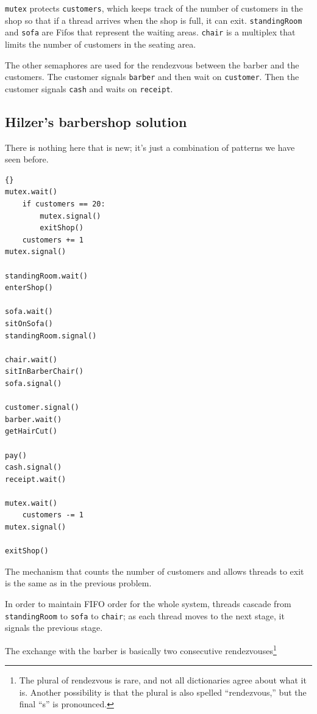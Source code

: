 \documentclass{book}
\newcommand{\clearemptydoublepage}{\newpage\cleardoublepage}
\begin{document}
{\tt mutex} protects {\tt customers}, which keeps track of the
number of customers in the shop so that if a thread arrives
when the shop is full, it can exit.  {\tt standingRoom} and
{\tt sofa} are Fifos that represent the waiting areas.  {\tt chair}
is a multiplex that limits the number of customers in the
seating area.

The other semaphores are used for the rendezvous between the
barber and the customers.  The customer signals {\tt barber} and
then wait on {\tt customer}.  Then the customer signals {\tt cash}
and waits on {\tt receipt}.

\clearemptydoublepage
\subsection {Hilzer's barbershop solution}

There is nothing here that is new; it's just a combination of
patterns we have seen before.

\begin{lstlisting}[caption={Hilzer's barbershop solution (customer)}]{}
mutex.wait()
    if customers == 20:
        mutex.signal()
        exitShop()
    customers += 1
mutex.signal()

standingRoom.wait()
enterShop()

sofa.wait()
sitOnSofa()
standingRoom.signal()

chair.wait()
sitInBarberChair()
sofa.signal()

customer.signal()
barber.wait()
getHairCut()

pay()
cash.signal()
receipt.wait()

mutex.wait()
    customers -= 1
mutex.signal()

exitShop()
\end{lstlisting}

The mechanism that counts the number of customers and allows
threads to exit is the same as in the previous problem.

In order to maintain FIFO order for the whole system, threads cascade
from {\tt standingRoom} to {\tt sofa} to {\tt chair}; as each thread
moves to the next stage, it signals the previous stage.

The exchange with the barber is basically two consecutive
rendezvouses\footnote{The plural of rendezvous is rare, and not
all dictionaries agree about what it is.  Another possibility is
that the plural is also spelled ``rendezvous,'' but the final
``s'' is pronounced.}
\end{document}
